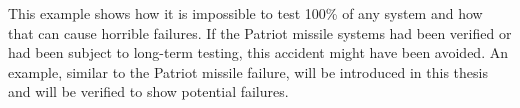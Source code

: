This example shows how it is impossible to test 100\% of any system and how that can cause horrible failures. If the Patriot missile systems had been verified or had been subject to long-term testing, this accident might have been avoided. An example, similar to the Patriot missile failure, will be introduced in this thesis and will be verified to show potential failures.



